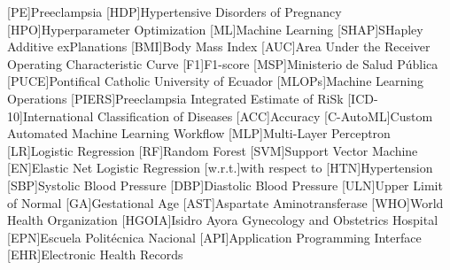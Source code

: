 \documentclass[diagnostics,article,accept,pdftex,moreauthors]{Definitions/mdpi}
\begin{document}
\begin{acronym}
    [PE]{Preeclampsia}
    [HDP]{Hypertensive Disorders of Pregnancy}
    [HPO]{Hyperparameter Optimization}
    [ML]{Machine Learning}
    [SHAP]{SHapley Additive exPlanations}
    [BMI]{Body Mass Index}
    [AUC]{Area Under the Receiver Operating Characteristic Curve}
    [F1]{F1-score}
    [MSP]{Ministerio de Salud Pública}
    [PUCE]{Pontifical Catholic University of Ecuador}
    [MLOPs]{Machine Learning Operations}
    [PIERS]{Preeclampsia Integrated Estimate of RiSk}
    [ICD-10]{International Classification of Diseases}
    [ACC]{Accuracy}
    [C-AutoML]{Custom Automated Machine
      Learning Workflow}
    [MLP]{Multi-Layer Perceptron}
    [LR]{Logistic Regression}
    [RF]{Random Forest}
    [SVM]{Support Vector Machine}
    [EN]{Elastic Net Logistic Regression}
    [w.r.t.]{with respect to}
    [HTN]{Hypertension}
    [SBP]{Systolic Blood Pressure}
    [DBP]{Diastolic Blood Pressure}
    [ULN]{Upper Limit of Normal}
    [GA]{Gestational Age}
    [AST]{Aspartate Aminotransferase}
    [WHO]{World Health Organization}
    [HGOIA]{Isidro Ayora Gynecology and Obstetrics Hospital}
    [EPN]{Escuela Politécnica Nacional}
    [API]{Application Programming Interface}
    [EHR]{Electronic Health Records}
\end{acronym}
  
  

\end{document}

